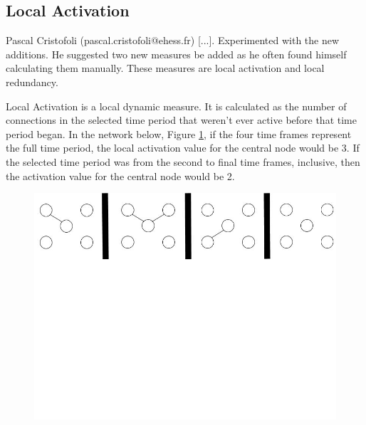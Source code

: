 \subsection{Local Activation}

Pascal Cristofoli (pascal.cristofoli@ehess.fr) [...]. Experimented with the new additions. He suggested two new measures be added as he often found himself calculating them manually. These measures are local activation and local redundancy.

Local Activation is a local dynamic measure. It is calculated as the number of connections in the selected time period that weren't ever active before that time period began. In the network below, Figure \ref{localActivation1}, if the four time frames represent the full time period, the local activation value for the central node would be 3. If the selected time period was from the second to final time frames, inclusive, then the activation value for the central node would be 2.

\begin{figure}[h!]
  \begin{center}
  \includegraphics[trim={0 10cm 0 -1cm}, width=120mm]{./Figures/localActivation1.jpg}
  \end{center}
  \caption{}{}
  \label{localActivation1}
\end{figure}



